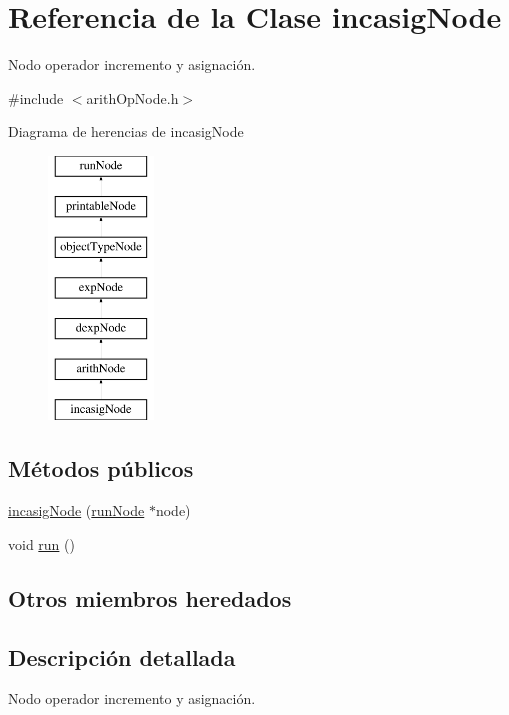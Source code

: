 \hypertarget{classincasigNode}{\section{Referencia de la Clase incasig\-Node}
\label{classincasigNode}
}


Nodo operador incremento y asignación.  




{\ttfamily \#include $<$arith\-Op\-Node.\-h$>$}

Diagrama de herencias de incasig\-Node\begin{figure}[H]
\begin{center}
\leavevmode
\includegraphics[height=7.000000cm]{classincasigNode}
\end{center}
\end{figure}
\subsection*{Métodos públicos}
\begin{DoxyCompactItemize}
\item 
\hyperlink{classincasigNode_a1a97d05ee1921ecf37b95beac39d7f56}{incasig\-Node} (\hyperlink{classrunNode}{run\-Node} $\ast$node)
\item 
void \hyperlink{classincasigNode_a88e017927106af6dfc6b8305108841c3}{run} ()
\end{DoxyCompactItemize}
\subsection*{Otros miembros heredados}


\subsection{Descripción detallada}
Nodo operador incremento y asignación. 

